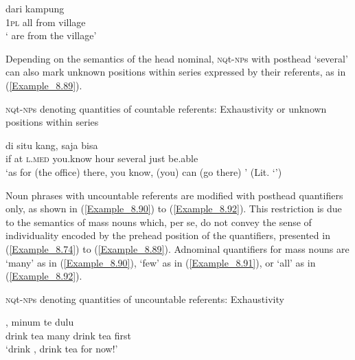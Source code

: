 \ea
\label{Example_8.88}
 {} {dari} {kampung}\\ %
 \textsc{1pl}  all  from  village\\
\glt 
‘ are from the village’ \textstyleExampleSource{[081010-001-Cv.0084]}
\z


Depending on the semantics of the head nominal, \textsc{nq}t\textsc{{}-np}s with posthead  ‘several’ can also mark unknown positions within series expressed by their referents, as in (\ref{Example_8.89}).



\begin{styleExampleTitle}
\textsc{nq}t\textsc{{}-np}s denoting  quantities of countable referents: Exhaustivity or unknown positions within series
\end{styleExampleTitle}
\ea
\label{Example_8.89}
 {di} {situ} {kang,} {} {} {saja} {bisa}\\ %
 if  at  \textsc{l.med}  you.know  hour  several  just  be.able\\
\glt 
‘as for (the office) there, you know, (you) can (go there) ’ (Lit. ‘’) \textstyleExampleSource{[081005-001-Cv.0001]}
\z


Noun phrases with uncountable referents are modified with posthead quantifiers only, as shown in (\ref{Example_8.90}) to (\ref{Example_8.92}). This restriction is due to the semantics of mass nouns which, per se, do not convey the sense of individuality encoded by the prehead position of the quantifiers, presented in (\ref{Example_8.74}) to (\ref{Example_8.89}). Adnominal quantifiers for mass nouns are  ‘many’ as in (\ref{Example_8.90}),  ‘few’ as in (\ref{Example_8.91}), or  ‘all’ as in (\ref{Example_8.92}).



\begin{styleExampleTitle}
\textsc{nq}t\textsc{{}-np}s denoting  quantities of uncountable referents: Exhaustivity
\end{styleExampleTitle}
\ea
\label{Example_8.90}
 {} {,} {minum} {te} {dulu}\\ %
 drink  tea  many  drink  tea  first\\
\glt 
‘drink , drink tea for now!’ \textstyleExampleSource{[081011-001-Cv.0240]}
\z

